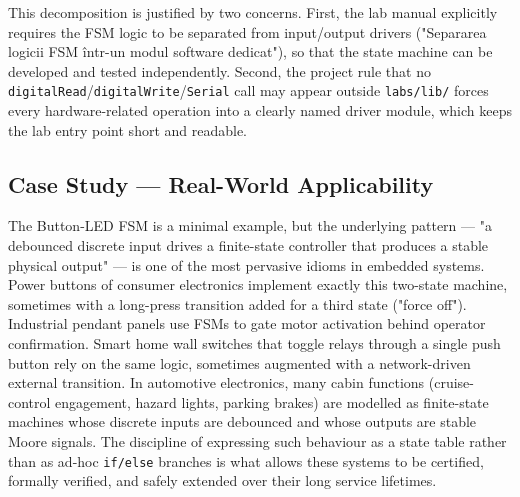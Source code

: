 This decomposition is justified by two concerns. First, the lab manual explicitly requires the FSM logic to be separated from input/output drivers ("Separarea logicii FSM într-un modul software dedicat"), so that the state machine can be developed and tested independently. Second, the project rule that no \texttt{digitalRead}/\texttt{digitalWrite}/\texttt{Serial} call may appear outside \texttt{labs/lib/} forces every hardware-related operation into a clearly named driver module, which keeps the lab entry point short and readable.

\subsection{Case Study --- Real-World Applicability}

The Button-LED FSM is a minimal example, but the underlying pattern --- "a debounced discrete input drives a finite-state controller that produces a stable physical output" --- is one of the most pervasive idioms in embedded systems. Power buttons of consumer electronics implement exactly this two-state machine, sometimes with a long-press transition added for a third state ("force off"). Industrial pendant panels use FSMs to gate motor activation behind operator confirmation. Smart home wall switches that toggle relays through a single push button rely on the same logic, sometimes augmented with a network-driven external transition. In automotive electronics, many cabin functions (cruise-control engagement, hazard lights, parking brakes) are modelled as finite-state machines whose discrete inputs are debounced and whose outputs are stable Moore signals. The discipline of expressing such behaviour as a state table rather than as ad-hoc \texttt{if/else} branches is what allows these systems to be certified, formally verified, and safely extended over their long service lifetimes.
